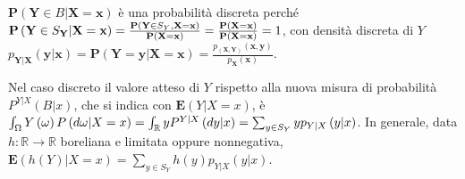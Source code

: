 \documentclass{article}
\begin{document}
\begin{description}
\item $\mathbf{P}\left( \mathbf{Y}\in B|\mathbf{X=x}\right) $ \`{e} una
probabilit\`{a} discreta perch\'{e} $\mathbf{P}\left( \mathbf{Y}\in S_{%
\mathbf{Y}}|\mathbf{X=x}\right) =\frac{\mathbf{P}\left( \mathbf{Y}\in S_{Y},%
\mathbf{X=x}\right) }{\mathbf{P}\left( \mathbf{X=x}\right) }=\frac{\mathbf{P}%
\left( \mathbf{X=x}\right) }{\mathbf{P}\left( \mathbf{X=x}\right) }=1$, con
densit\`{a} discreta di $Y$ $p_{\mathbf{Y|X}}\left( \mathbf{y|x}\right) =%
\mathbf{P}\left( \mathbf{Y=y|X=x}\right) =\frac{p_{\left( \mathbf{X,Y}%
\right) }\left( \mathbf{x,y}\right) }{p_{\mathbf{X}}\left( \mathbf{x}\right) 
}$.
\end{description}

Nel caso discreto il valore atteso di $Y$ rispetto alla nuova misura di
probabilit\`{a} $P^{Y|X}\left( B|x\right) $, che si indica con $\mathbf{E}%
\left( Y|X=x\right) $, \`{e} $\int_{\Omega }Y\left( \omega \right) P\left(
d\omega |X=x\right) =\int_{%
\mathbb{R}
}yP^{Y|X}\left( dy|x\right) =\sum_{y\in S_{Y}}yp_{Y|X}\left( y|x\right) $.
In generale, data $h:%
\mathbb{R}
\rightarrow 
\mathbb{R}
$ boreliana e limitata oppure nonnegativa, $\mathbf{E}\left( h\left(
Y\right) |X=x\right) =\sum_{y\in S_{Y}}h\left( y\right) p_{Y|X}\left(
y|x\right) $.
\end{document}

